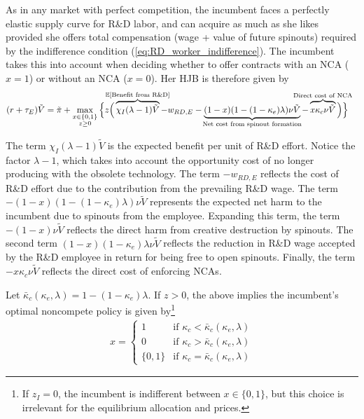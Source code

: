 \documentclass[11pt,english]{article}
\theoremstyle{remark}
\begin{document}
As in any market with perfect competition, the incumbent faces a perfectly elastic supply curve for R\&D labor, and can acquire as much as she likes provided she offers total compensation (wage + value of future spinouts) required by the indifference condition (\ref{eq:RD_worker_indifference}). The incumbent takes this into account when deciding whether to offer contracts with an NCA ($x = 1$) or without an NCA ($x = 0$). Her HJB is therefore given by 
\begin{align}
	(r + \tau_E) \tilde{V} &= \tilde{\pi} + \max_{\substack{x \in \{0,1\} \\ z \ge 0}} \Big\{z \Big( \overbrace{\chi_I (\lambda - 1) \tilde{V}}^{\mathclap{\mathbb{E}[\textrm{Benefit from R\&D}]}}- w_{RD,E} -  \underbrace{(1-x)(1 - (1-\kappa_{e})\lambda)\nu \tilde{V}}_{\mathclap{\text{Net cost from spinout formation}}} - \overbrace{x \kappa_{c} \nu \tilde{V}}^{\mathclap{\text{Direct cost of NCA}}}\Big) \Big\} \label{eq:hjb_incumbent_workerIndiff}
\end{align}

The term $\chi_I(\lambda -1) \tilde{V}$ is the expected benefit per unit of R\&D effort. Notice the factor $\lambda -1$, which takes into account the opportunity cost of no longer producing with the obsolete technology. The term $-w_{RD,E}$ reflects the cost of R\&D effort due to the contribution from the prevailing R\&D wage. The term $-(1-x)(1 - (1-\kappa_e) \lambda) \nu \tilde{V}$ represents the expected net harm to the incumbent due to spinouts from the employee. Expanding this term, the term $-(1-x)\nu \tilde{V}$ reflects the direct harm from creative destruction by spinouts. The second term $(1-x)(1-\kappa_e)\lambda \nu \tilde{V}$ reflects the reduction in R\&D wage accepted by the R\&D employee in return for being free to open spinouts. Finally, the term $-x \kappa_c \nu \tilde{V}$ reflects the direct cost of enforcing NCAs.

Let $\bar{\kappa}_c (\kappa_e, \lambda) = 1 - (1-\kappa_e)\lambda$. If $z > 0$, the above implies the incumbent's optimal noncompete policy is given by\footnote{If $z_I = 0$, the incumbent is indifferent between $x \in\{0,1\}$, but this choice is irrelevant for the equilibrium allocation and prices.} 
\begin{align}
x = \begin{cases}
1 & \textrm{if } \kappa_{c} < \bar{\kappa}_c (\kappa_e, \lambda) \\
0 & \textrm{if } \kappa_{c} > \bar{\kappa}_c (\kappa_e, \lambda)\\
\{0,1\} & \textrm{if } \kappa_c = \bar{\kappa}_c (\kappa_e, \lambda) 
\end{cases} \label{eq_nca_policy}
\end{align}
\end{document}
